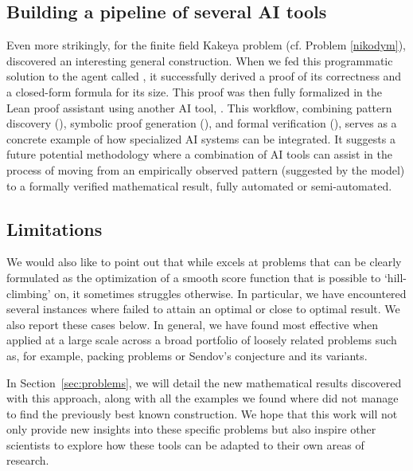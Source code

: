 \subsection{Building a pipeline of several AI tools}
Even more strikingly, for the finite field Kakeya problem (cf. Problem \ref{nikodym}), \AlphaEvolve discovered an interesting general construction. When we fed this programmatic solution to the agent  called \DeepThink \cite{deepmind2025dt}, it successfully derived a proof of its correctness and a closed-form formula for its size. This proof was then fully formalized in the Lean proof assistant using another AI tool, \AlphaProof \cite{deepmind2024alphaproof}. 
This workflow, combining pattern discovery (\AlphaEvolve), symbolic proof generation (\DeepThink), and formal verification (\AlphaProof), serves as a concrete example of how specialized AI systems can be integrated. It suggests a future potential methodology where a combination of AI tools can assist in the process of moving from an empirically observed pattern (suggested by the model) to a formally verified mathematical result, fully automated or semi-automated.




\subsection{Limitations}

We would also like to point out that while \AlphaEvolve excels at problems that can be clearly formulated as the optimization of a smooth score function that is possible to `hill-climbing' on, it sometimes struggles otherwise. In particular, we have encountered several instances where \AlphaEvolve failed to attain an optimal or close to optimal result. We also report these cases below. In general, we have found \AlphaEvolve most effective when applied at a large scale across a broad portfolio of loosely related problems such as, for example,  packing problems or Sendov's conjecture and its variants.


In Section~\ref{sec:problems}, we will detail the new mathematical results discovered with this approach, along with all the examples we found where \AlphaEvolve did not manage to find the previously best known construction. We hope that this work will not only provide new insights into these specific problems but also inspire other scientists to explore how these tools can be adapted to their own areas of research.




